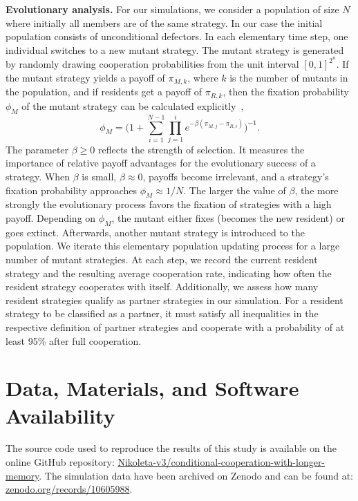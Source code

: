 \documentclass[11pt]{article}
\begin{document}
\noindent
{\bf Evolutionary analysis.} For our simulations, we consider a population of size \(N\) where initially all
members are of the same strategy. 
In our case the initial population consists of unconditional defectors. 
In each elementary time step, one individual switches to a new mutant strategy. 
The mutant strategy is generated by randomly drawing cooperation probabilities from the unit interval \([0,1]^{2^n}\). 
If the mutant strategy yields a payoff of \(\pi_{M, k}\), where \(k\) is the number of
mutants in the population, and if residents get a payoff of \(\pi_{R,
k}\), then the fixation probability \(\phi_{M}\) of the mutant strategy can be
calculated explicitly~\citep{nowak:Nature:2004},
\begin{equation}\label{eq:fixation_probability}
  \phi_{M} =\Big(1 + \displaystyle \sum_{i=1}^{N - 1} \prod_{j=1}^{i} e^{- \beta (\pi_{M, j} - \pi_{R, i})} \Big)^{-1}.
\end{equation}
The parameter \(\beta \geq 0\) reflects the strength of selection. 
It measures the importance of relative payoff advantages for the evolutionary success of a strategy. 
When \(\beta\) is small, \(\beta \approx 0\), payoffs become irrelevant, and a strategy's fixation probability approaches
\(\phi_{M} \approx 1 / N\). 
The larger the value of \(\beta\), the more strongly the evolutionary process favors the fixation of strategies with a high
payoff.
Depending on \(\phi_{M}\), the mutant either fixes (becomes the new resident) or goes extinct. 
Afterwards, another mutant strategy is introduced to the population. 
We iterate this elementary population updating process for a large number of
mutant strategies. At each step, we record the current resident
strategy and the resulting average cooperation rate, indicating how often the
resident strategy cooperates with itself. Additionally, we assess how many
resident strategies qualify as partner strategies in our simulation. For a
resident strategy to be classified as a partner, it must satisfy all
inequalities in the respective definition of partner strategies and cooperate
with a probability of at least 95\% after full cooperation. 



\section*{Data, Materials, and Software Availability}

The source code used to reproduce the results of this study is available on the
online GitHub repository:
\href{https://github.com/Nikoleta-v3/conditional-cooperation-with-longer-memory}{Nikoleta-v3/conditional-cooperation-with-longer-memory}.
The simulation data have been archived on Zenodo and can be found at:
\href{https://zenodo.org/records/10605988}{zenodo.org/records/10605988}.
\end{document}
